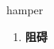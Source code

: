 
\begin{frame}
{\huge hamper}
\begin{center}
\begin{enumerate}\Large
  \item \textbf{阻碍}
\end{enumerate}
\end{center}
\end{frame}
